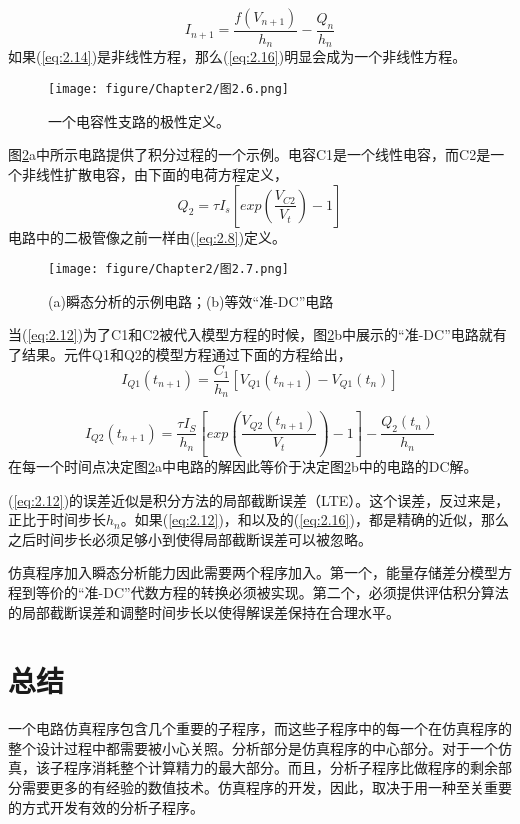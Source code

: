 \begin{equation}
    I_{n+1}=\frac{f(V_{n+1})}{h_n}-\frac{Q_n}{h_n}
    \label{eq:2.16}
\end{equation}
如果(\ref{eq:2.14})是非线性方程，那么(\ref{eq:2.16})明显会成为一个非线性方程。

\begin{figure}[htbp]
\small
    \centering
    \texttt{[image: figure/Chapter2/图2.6.png]}
    \caption{一个电容性支路的极性定义。}
    \label{图2.6}
\end{figure}

图\ref{图2.7}a中所示电路提供了积分过程的一个示例。电容C1是一个线性电容，而C2是一个非线性扩散电容，由下面的电荷方程定义，
\begin{equation}
    Q_2 = \tau I_s[exp(\frac{V_{C2}}{V_t})-1]
    \label{eq:2.17}
\end{equation}
电路中的二极管像之前一样由(\ref{eq:2.8})定义。

\begin{figure}[htbp]
\small
    \centering
    \texttt{[image: figure/Chapter2/图2.7.png]}
    \caption{(a)瞬态分析的示例电路；(b)等效“准-DC”电路}
    \label{图2.7}
\end{figure}

当(\ref{eq:2.12})为了C1和C2被代入模型方程的时候，图\ref{图2.7}b中展示的“准-DC”电路就有了结果。元件Q1和Q2的模型方程通过下面的方程给出，
\begin{equation}
    I_{Q1}(t_{n+1})=\frac{C_1}{h_n}[V_{Q1}(t_{n+1})-V_{Q1}(t_n)]
    \label{eq:2.18}
\end{equation}

\begin{equation}
    I_{Q2}(t_{n+1})=\frac{\tau I_S}{h_n}[exp(\frac{V_{Q2}(t_{n+1})}{V_t})-1]-\frac{Q_2(t_n)}{h_n}
    \label{eq:2.19}
\end{equation}
在每一个时间点决定图\ref{图2.7}a中电路的解因此等价于决定图\ref{图2.7}b中的电路的DC解。

(\ref{eq:2.12})的误差近似是积分方法的局部截断误差（LTE）。这个误差，反过来是，正比于时间步长$h_n$。如果(\ref{eq:2.12})，和以及的(\ref{eq:2.16})，都是精确的近似，那么之后时间步长必须足够小到使得局部截断误差可以被忽略。

仿真程序加入瞬态分析能力因此需要两个程序加入。第一个，能量存储差分模型方程到等价的“准-DC”代数方程的转换必须被实现。第二个，必须提供评估积分算法的局部截断误差和调整时间步长以使得解误差保持在合理水平。

\section{总结}
一个电路仿真程序包含几个重要的子程序，而这些子程序中的每一个在仿真程序的整个设计过程中都需要被小心关照。分析部分是仿真程序的中心部分。对于一个仿真，该子程序消耗整个计算精力的最大部分。而且，分析子程序比做程序的剩余部分需要更多的有经验的数值技术。仿真程序的开发，因此，取决于用一种至关重要的方式开发有效的分析子程序。

